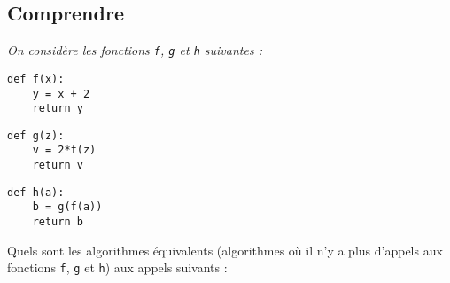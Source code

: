 \subsection{Comprendre}
\begin{td}\label{td:passage}
\em
On considère les fonctions {\tt f}, {\tt g} et {\tt h} suivantes :

\begin{center}
\begin{py}{4cm}
\begin{verbatim}
def f(x):
    y = x + 2
    return y
\end{verbatim}
\end{py}\hspace*{1cm}
\begin{py}{4cm}
\begin{verbatim}
def g(z):
    v = 2*f(z)
    return v
\end{verbatim}
\end{py}\hspace*{1cm}
\begin{py}{4cm}
\begin{verbatim}
def h(a):
    b = g(f(a))
    return b
\end{verbatim}
\end{py}
\end{center}

Quels sont les algorithmes équivalents (algorithmes où il n'y a plus 
d'appels aux fonctions {\tt f}, {\tt g} et {\tt h}) aux appels suivants :
\vspace*{2mm}


\end{td}
